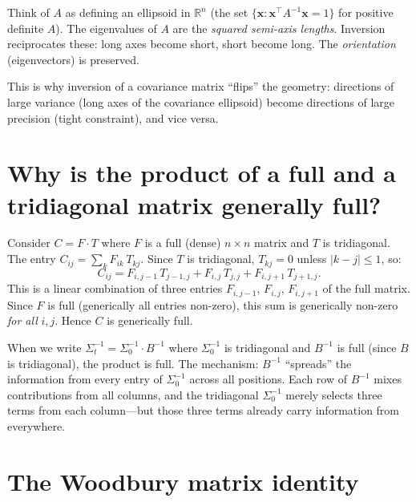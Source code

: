 \documentclass[11pt,a4paper]{article}
\newcommand{\R}{\mathbb{R}}
\begin{document}
Think of $A$ as defining an ellipsoid in $\R^n$ (the set $\{\mathbf{x} : \mathbf{x}^\top A^{-1} \mathbf{x} = 1\}$ for positive definite $A$).  The eigenvalues of $A$ are the \emph{squared semi-axis lengths}.  Inversion reciprocates these: long axes become short, short become long.  The \emph{orientation} (eigenvectors) is preserved.

This is why inversion of a covariance matrix ``flips'' the geometry: directions of large variance (long axes of the covariance ellipsoid) become directions of large precision (tight constraint), and vice versa.


\section{Why is the product of a full and a tridiagonal matrix generally full?}
\label{sec:q10}

Consider $C = F \cdot T$ where $F$ is a full (dense) $n \times n$ matrix and $T$ is tridiagonal.  The entry $C_{ij} = \sum_k F_{ik}\,T_{kj}$.  Since $T$ is tridiagonal, $T_{kj} = 0$ unless $|k - j| \leq 1$, so:
\begin{equation}
  C_{ij} = F_{i,j-1}\,T_{j-1,j} + F_{i,j}\,T_{j,j} + F_{i,j+1}\,T_{j+1,j}.
\end{equation}
This is a linear combination of three entries $F_{i,j-1}$, $F_{i,j}$, $F_{i,j+1}$ of the full matrix.  Since $F$ is full (generically all entries non-zero), this sum is generically non-zero \emph{for all} $i, j$.  Hence $C$ is generically full.

\begin{intuitionbox}
When we write $\Sigma_t^{-1} = \Sigma_0^{-1} \cdot B^{-1}$ where $\Sigma_0^{-1}$ is tridiagonal and $B^{-1}$ is full (since $B$ is tridiagonal), the product is full.  The mechanism: $B^{-1}$ ``spreads'' the information from every entry of $\Sigma_0^{-1}$ across all positions.  Each row of $B^{-1}$ mixes contributions from all columns, and the tridiagonal $\Sigma_0^{-1}$ merely selects three terms from each column---but those three terms already carry information from everywhere.
\end{intuitionbox}


\section{The Woodbury matrix identity}
\label{sec:q11}
\end{document}
